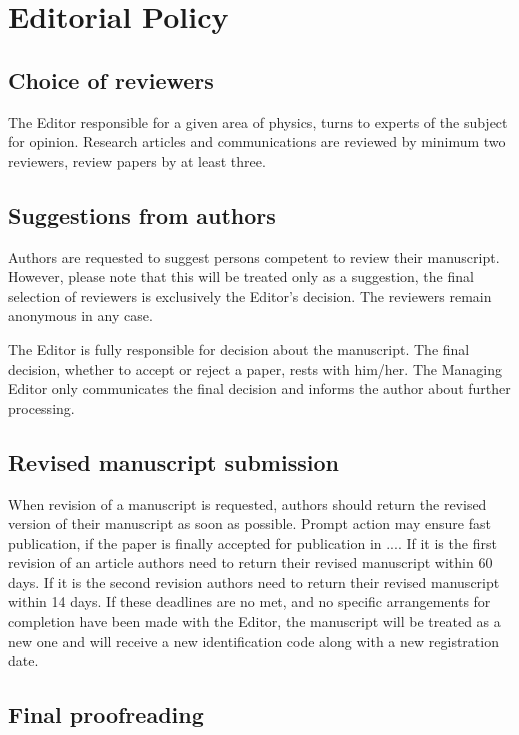 \section{Editorial Policy}

\subsection{Choice of reviewers}

The Editor responsible for a given area of physics, turns to experts of the subject for opinion. Research articles and communications are reviewed by minimum two reviewers, review papers by at least three.

\subsection{Suggestions from authors}

Authors are requested to suggest persons competent to review their manuscript. However, please note that this will be treated only as a suggestion, the final selection of reviewers is exclusively the Editor's decision. The reviewers remain anonymous in any case.

The Editor is fully responsible for decision about the manuscript. The final decision, whether to accept or reject a paper, rests with him/her. The Managing Editor only communicates the final decision and informs the author about further processing.

\subsection{Revised manuscript submission}

When revision of a manuscript is requested, authors should return the revised version of their manuscript as soon as possible. Prompt action may ensure fast publication, if the paper is finally accepted for publication in .... If it is the first revision of an article authors need to return their revised manuscript within 60 days. If it is the second revision authors need to return their revised manuscript within 14 days. If these deadlines are no met, and no specific arrangements for completion have been made with the Editor, the manuscript will be treated as a new one and will receive a new identification code along with a new registration date.

\subsection{Final proofreading}

